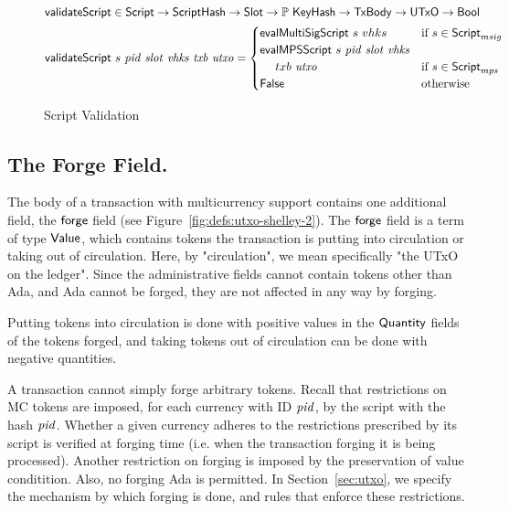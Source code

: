 \begin{figure*}[htb]
    \begin{align*}
      \mathsf{validateScript} & \in\mathsf{Script}\to\mathsf{ScriptHash}\to\mathsf{Slot}\to
      \mathbb{P}~\mathsf{KeyHash}\to\mathsf{TxBody}\to\mathsf{UTxO}\to\mathsf{Bool} \\
      \mathsf{validateScript} & ~s~\mathit{pid}~\mathit{slot}~\mathit{vhks}
       ~\mathit{txb}~\mathit{utxo} =
                             \begin{cases}
                               \mathsf{evalMultiSigScript}~s~vhks & \text{if}~s \in\mathsf{Script}_{msig} \\
                               \mathsf{evalMPSScript}~s~\mathit{pid}~\mathit{slot}~\mathit{vhks} \\
                                ~~~~txb~\mathit{utxo} & \text{if}~s \in\mathsf{Script}_{mps} \\
                               \mathsf{False} & \text{otherwise}
                             \end{cases} \\
    \end{align*}
  \caption{Script Validation}
  \label{fig:defs:tx-mc-valid}
\end{figure*}

\subsection*{The Forge Field.}

The body of a transaction with multicurrency support contains one additional
field, the $\mathsf{forge}$ field (see Figure~\ref{fig:defs:utxo-shelley-2}).
The $\mathsf{forge}$ field is a term of type $\mathsf{Value}$, which contains
tokens the transaction is putting into circulation or taking out of
circulation. Here, by "circulation", we mean specifically "the UTxO on the
ledger". Since the administrative fields cannot contain tokens other than Ada,
and Ada cannot be forged, they are not affected in any way by forging.

Putting tokens into circulation is done with positive values in the $\mathsf{Quantity}$
fields of the tokens forged, and taking tokens out of circulation can be done
with negative quantities.

A transaction cannot simply forge arbitrary tokens. Recall that restrictions on
MC tokens are imposed, for each currency with ID $\mathit{pid}$, by the script
with the hash $\mathit{pid}$. Whether a given currency adheres to the restrictions
prescribed by its script is verified at forging time (i.e. when the transaction
forging it is being processed). Another restriction on forging is imposed by
the preservation of value conditition. Also, no forging Ada
is permitted. In Section~\ref{sec:utxo}, we specify the mechanism by which
forging is done, and rules that enforce these restrictions.

